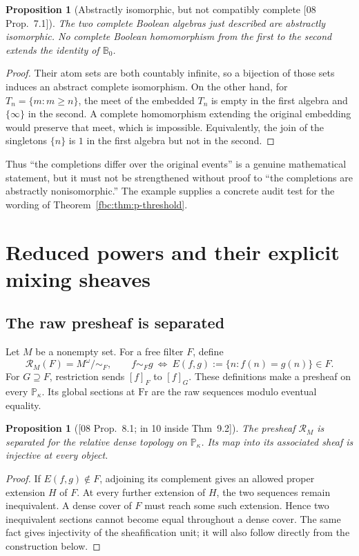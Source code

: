 \documentclass[11pt,letterpaper]{article}
\newtheorem{proposition}[theorem]{Proposition}
\theoremstyle{definition}
\theoremstyle{remark}
\newcommand{\om}{\omega}
\newcommand{\Fr}{\mathrm{Fr}}
\newcommand{\B}{\mathbb B}
\newcommand{\PP}{\mathbb P}
\newcommand{\R}{\mathscr R}
\newcommand{\eqset}[2]{E(#1,#2)}
\newcommand{\src}[1]{\textup{[#1]}}
\begin{document}
\begin{proposition}[Abstractly isomorphic, but not compatibly complete \src{08 Prop.~7.1}]
\label{fbc:prop:toy}
The two complete Boolean algebras just described are abstractly
isomorphic. No complete Boolean homomorphism from the first to the
second extends the identity of $\B_0$.
\end{proposition}
\begin{proof}
Their atom sets are both countably infinite, so a bijection of those
sets induces an abstract complete isomorphism. On the other hand,
for $T_n=\{m:m\geq n\}$, the meet of the embedded $T_n$ is empty
in the first algebra and $\{\infty\}$ in the second. A complete
homomorphism extending the original embedding would preserve that
meet, which is impossible. Equivalently, the join of the singletons
$\{n\}$ is $1$ in the first algebra but not in the second.
\end{proof}

Thus ``the completions differ over the original events'' is a genuine
mathematical statement, but it must not be strengthened without proof
to ``the completions are abstractly nonisomorphic.'' The example
supplies a concrete audit test for the wording of
Theorem~\ref{fbc:thm:p-threshold}.

\section{Reduced powers and their explicit mixing sheaves}
\label{fbc:sec:mixing}

\subsection{The raw presheaf is separated}
Let $M$ be a nonempty set. For a free filter $F$, define
\[
 \R_M(F)=M^\om/{\sim_F},
 \qquad f\sim_Fg\ \Longleftrightarrow\
 \eqset{f}{g}:=\{n:f(n)=g(n)\}\in F.
\]
For $G\supseteq F$, restriction sends $[f]_F$ to $[f]_G$.
These definitions make a presheaf on every $\PP_\kappa$. Its global
sections at $\Fr$ are the raw sequences modulo eventual equality.

\begin{proposition}[\src{08 Prop.~8.1; in 10 inside Thm~9.2}]\label{fbc:prop:separated}
The presheaf $\R_M$ is separated for the relative dense topology on
$\PP_\kappa$. Its map into its associated sheaf is injective at
every object.
\end{proposition}
\begin{proof}
If $\eqset{f}{g}\notin F$, adjoining its complement gives an
allowed proper extension $H$ of $F$. At every further extension
of $H$, the two sequences remain inequivalent. A dense cover of
$F$ must reach some such extension. Hence two inequivalent sections
cannot become equal throughout a dense cover. The same fact gives
injectivity of the sheafification unit; it will also follow directly
from the construction below.
\end{proof}
\end{document}
